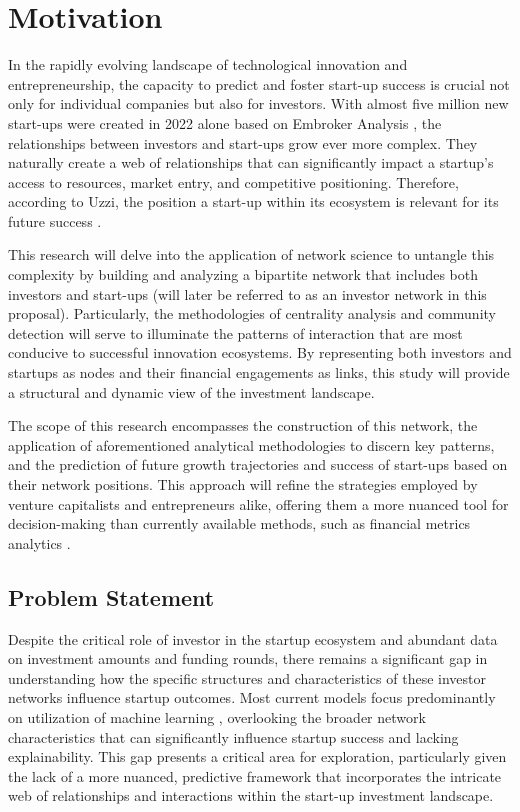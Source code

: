 \documentclass[a4paper,11pt]{article}
\begin{document}
\section{Motivation}
In the rapidly evolving landscape of technological innovation and entrepreneurship, the capacity to predict and foster start-up success is crucial not only for individual companies but also for investors. With almost five million new start-ups were created in 2022 alone based on Embroker Analysis \cite{embroker2024a}, the relationships between investors and start-ups grow ever more complex. They naturally create a web of relationships that can significantly impact a startup’s access to resources, market entry, and competitive positioning. Therefore, according to Uzzi, the position
a start-up within its ecosystem is relevant for its future success \cite{uzzi2021a}.

This research will delve into the application of network science to untangle this complexity by building and analyzing a bipartite network that includes both investors and start-ups (will later be referred to as an investor network in this proposal). Particularly, the methodologies of centrality analysis and community detection will serve to illuminate the patterns of interaction that are most conducive to successful innovation ecosystems. By representing both investors and startups as nodes and their financial engagements as links, this study will provide a structural and dynamic view of the investment landscape.

The scope of this research encompasses the construction of this network, the application of aforementioned analytical methodologies to discern key patterns, and the prediction of future growth trajectories and success of start-ups based on their network positions. This approach will refine the strategies employed by venture capitalists and entrepreneurs alike, offering them a more nuanced tool for decision-making than currently available methods, such as financial metrics analytics \cite{gompers2016a}.

\subsection{Problem Statement}
Despite the critical role of investor in the startup ecosystem and abundant data on investment amounts and funding rounds, there remains a significant gap in understanding how the specific structures and characteristics of these investor networks influence startup outcomes. Most current models focus predominantly on utilization of machine learning \cite{krishna2016a} \cite{carniel2023a} \cite{sharchilev2018a} \cite{yang2020a}, overlooking the broader network characteristics that can significantly influence startup success and lacking explainability. This gap presents a critical area for exploration, particularly given the lack of a more nuanced, predictive framework that incorporates the intricate web of relationships and interactions within the start-up investment landscape.
\end{document}

